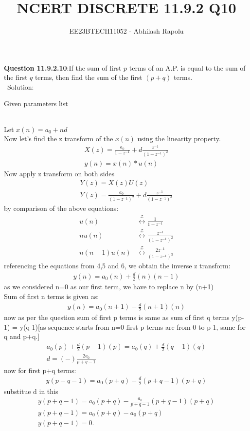 \documentclass[journal,12pt,twocolumn]{IEEEtran}
\title{NCERT DISCRETE 11.9.2 Q10}
\author{EE23BTECH11052 - Abhilash Rapolu }
\begin{document}
\maketitle
\newpage
\textbf{Question 11.9.2.10}:If the sum of first $p$ terms of an A.P. is equal to the sum of the first $q$ terms, then
find the sum of the first $(p + q)$ terms.\\
\ Solution:
\begin{table}[htbp]
\centering

\caption{Given parameters list}
\end{table}
\\Let $x(n)=a_0+nd$\\
Now let's find the z transform of the $x(n)$ using the linearity property.\\
\begin{align}
X(z)=\frac{a_0}{1-z^{-1}}+d\frac{z^{-1}}{(1-z^{-1})^2}\\
y(n) = x(n)*u(n)
\end{align}
Now apply z transform on both sides\\
\begin{align}
Y(z)=X(z)U(z)\\
Y(z)=\frac{a_0}{(1-z^{-1})^2}+d\frac{z^{-1}}{(1-z^{-1})^3}
\end{align}
by comparison of the above equations:\\
\begin{align}
u(n) &\stackrel{\mathcal{Z}}{\longleftrightarrow} \frac{1}{1-z^{-1}}\\
nu(n) &\stackrel{\mathcal{Z}}{\longleftrightarrow} \frac{z^{-1}}{(1-z^{-1})^2} \\
n(n-1)u(n) &\stackrel{\mathcal{Z}}{\longleftrightarrow} \frac{2z^{-1}}{(1-z^{-1})^3} 
\end{align}
referencing the equations from 4,5 and 6, we obtain the inverse z transform:\\
\begin{align}
y(n)=a_0(n)+\frac{d}{2}(n)(n-1)
\end{align}
as we considered n=0 as our first term, we have to replace n by (n+1)\\
Sum of first n terms is given as:\\
\begin{align}
y(n)=a_0(n+1)+\frac{d}{2}(n+1)(n)
\end{align}
now as per the question sum of first p terms is same as sum of first q terms y(p-1) = y(q-1)[as sequence starts from n=0 first p terms are from 0 to p-1, same for q and p+q.]\\
\begin{align}
a_0(p)+\frac{d}{2}(p-1)(p)=a_0(q)+\frac{d}{2}(q-1)(q)\\
d=(-)\frac{2a_0}{p+q-1}
\end{align}
now for first p+q terms:\\
\begin{align}
y(p+q-1)=a_0(p+q)+\frac{d}{2}(p+q-1)(p+q)
\end{align}
substitue d in this\\
\begin{align}
y(p+q-1)=a_0(p+q)-\frac{a_0}{p+q-1}(p+q-1)(p+q)\\
y(p+q-1)=a_0(p+q)-a_0(p+q)\\
y(p+q-1)=0.
\end{align}
\end{document}
